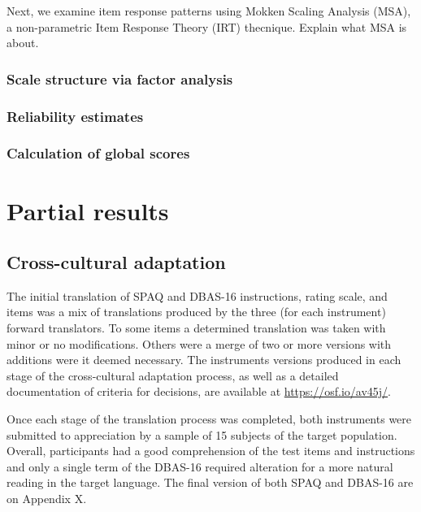\documentclass[
  ,doc,11pt, twoside,floatsintext]{apa6}
\begin{document}
Next, we examine item response patterns using Mokken Scaling Analysis (MSA), a non-parametric Item Response Theory (IRT) thecnique. Explain what MSA is about.

\hypertarget{scale-structure-via-factor-analysis}{%
\subsubsection{Scale structure via factor analysis}\label{scale-structure-via-factor-analysis}}

\hypertarget{reliability-estimates}{%
\subsubsection{Reliability estimates}\label{reliability-estimates}}

\hypertarget{calculation-of-global-scores}{%
\subsubsection{Calculation of global scores}\label{calculation-of-global-scores}}

\newpage

\hypertarget{partial-results}{%
\section{Partial results}\label{partial-results}}

\hypertarget{cross-cultural-adaptation}{%
\subsection{Cross-cultural adaptation}\label{cross-cultural-adaptation}}

The initial translation of SPAQ and DBAS-16 instructions, rating scale, and items was a mix of translations produced by the three (for each instrument) forward translators. To some items a determined translation was taken with minor or no modifications. Others were a merge of two or more versions with additions were it deemed necessary. The instruments versions produced in each stage of the cross-cultural adaptation process, as well as a detailed documentation of criteria for decisions, are available at \url{https://osf.io/av45j/}.

Once each stage of the translation process was completed, both instruments were submitted to appreciation by a sample of 15 subjects of the target population. Overall, participants had a good comprehension of the test items and instructions and only a single term of the DBAS-16 required alteration for a more natural reading in the target language. The final version of both SPAQ and DBAS-16 are on Appendix X.
\end{document}
